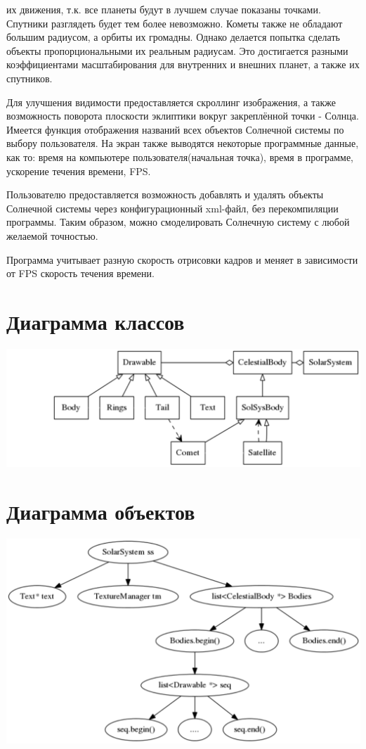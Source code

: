 \documentclass[oneside,final]{article}
\begin{document}
их
движения, т.к. все планеты будут в лучшем случае показаны точками.
Спутники разглядеть будет тем более невозможно. Кометы также не обладают
большим радиусом, а орбиты их громадны. Однако делается попытка сделать
объекты пропорциональными их реальным радиусам. Это достигается разными
коэффициентами масштабирования для внутренних и внешних планет, а также
их спутников.
\par Для улучшения видимости предоставляется скроллинг изображения, а
также возможность поворота плоскости эклиптики вокруг закреплённой точки
- Солнца. Имеется функция отображения названий всех объектов Солнечной
системы по выбору пользователя. На экран также выводятся некоторые
программные данные, как то: время на компьютере пользователя(начальная
точка), время в программе, ускорение течения времени, FPS.
\par Пользователю предоставляется возможность добавлять и удалять объекты
Солнечной системы через конфигурационный xml-файл, без перекомпиляции
программы. Таким образом, можно смоделировать Солнечную систему с любой
желаемой точностью.
\par Программа учитывает разную скорость отрисовки кадров и меняет в
зависимости от FPS скорость течения времени.

\section{Диаграмма классов}
\includegraphics[]{2.png}

\section{Диаграмма объектов}
\includegraphics[]{3.png}
\end{document}
